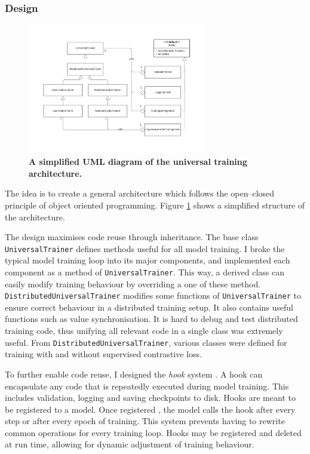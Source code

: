 \documentclass[12pt,a4paper,twoside,openany]{report}
\begin{document}
\subsubsection{Design}
\begin{figure}[H]
    \centering
    \includegraphics[width=0.7\textwidth]{figs/implementation/trainer/simple_uml.png}
    \caption{\textbf{A simplified UML diagram of the universal training architecture.}}
    \label{fig:simple_uml}
\end{figure}

The idea is to create a general architecture which follows the open–closed principle of object oriented programming. Figure \ref{fig:simple_uml} shows a simplified structure of the architecture.

The design maximises code reuse through inheritance. The base class \verb|UniversalTrainer| defines methods useful for all model training. I broke the typical model training loop into its major components, and implemented each component as a method of \verb|UniversalTrainer|. This way, a derived class can easily modify training behaviour by overriding a one of these method. 
\verb|DistributedUniversalTrainer| modifies some functions of \verb|UniversalTrainer| to ensure correct behaviour in a distributed training setup. It also contains useful functions such as value synchronisation. It is hard to debug and test distributed training code, thus unifying all relevant code in a single class was extremely useful. From \verb|DistributedUniversalTrainer|, various classes were defined for training with and without supervised contrastive loss.

To further enable code reuse, I designed the \textit{hook} system . A hook can encapsulate any code that is repeatedly executed during model training. This includes validation, logging and saving checkpoints to disk. Hooks are meant to be registered to a model. Once registered , the model calls the hook after every step or after every epoch of training. This system prevents having to rewrite common operations for every training loop. Hooks may be registered and deleted at run time, allowing for dynamic adjustment of training behaviour.
\end{document}
